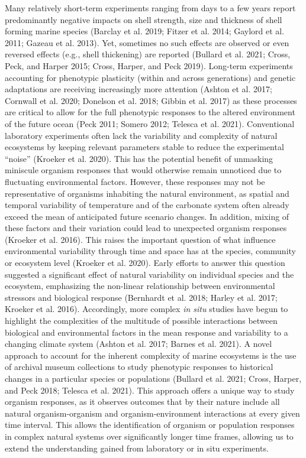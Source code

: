 \documentclass[smallextended]{svjour3}       %
\begin{document}
Many relatively short-term experiments ranging from days to a few years
report predominantly negative impacts on shell strength, size and
thickness of shell forming marine species (Barclay et al. 2019; Fitzer
et al. 2014; Gaylord et al. 2011; Gazeau et al. 2013). Yet, sometimes no
such effects are observed or even reversed effects (e.g., shell
thickening) are reported (Bullard et al. 2021; Cross, Peck, and Harper
2015; Cross, Harper, and Peck 2019). Long-term experiments accounting
for phenotypic plasticity (within and across generations) and genetic
adaptations are receiving increasingly more attention (Ashton et al.
2017; Cornwall et al. 2020; Donelson et al. 2018; Gibbin et al. 2017) as
these processes are critical to allow for the full phenotypic responses
to the altered environment of the future ocean (Peck 2011; Somero 2012;
Telesca et al. 2021). Conventional laboratory experiments often lack the
variability and complexity of natural ecosystems by keeping relevant
parameters stable to reduce the experimental ``noise'' (Kroeker et al.
2020). This has the potential benefit of unmasking miniscule organism
responses that would otherwise remain unnoticed due to fluctuating
environmental factors. However, these responses may not be
representative of organisms inhabiting the natural environment, as
spatial and temporal variability of temperature and of the carbonate
system often already exceed the mean of anticipated future scenario
changes. In addition, mixing of these factors and their variation could
lead to unexpected organism responses (Kroeker et al. 2016). This raises
the important question of what influence environmental variability
through time and space has at the species, community or ecosystem level
(Kroeker et al. 2020). Early efforts to answer this question suggested a
significant effect of natural variability on individual species and the
ecosystem, emphasizing the non-linear relationship between environmental
stressors and biological response (Bernhardt et al. 2018; Harley et al.
2017; Kroeker et al. 2016). Accordingly, more complex \emph{in situ}
studies have begun to highlight the complexities of the multitude of
possible interactions between biological and environmental factors in
the mean response and variability to a changing climate system (Ashton
et al. 2017; Barnes et al. 2021). A novel approach to account for the
inherent complexity of marine ecosystems is the use of archival museum
collections to study phenotypic responses to historical changes in a
particular species or populations (Bullard et al. 2021; Cross, Harper,
and Peck 2018; Telesca et al. 2021). This approach offers a unique way
to study organism responses, as it observes outcomes that by their
nature include all natural organism-organism and organism-environment
interactions at every given time interval. This allows the
identification of organism or population responses in complex natural
systems over significantly longer time frames, allowing us to extend the
understanding gained from laboratory or in situ experiments.
\end{document}
